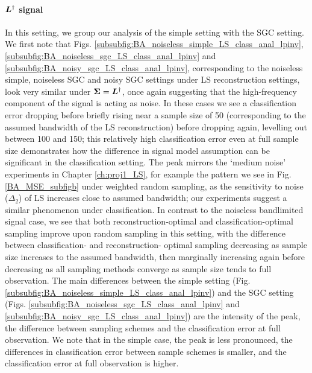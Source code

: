 \paragraph{$\bm{L}^{\dagger}$ signal} In this setting, we group our analysis of the simple setting with the SGC setting. We first note that Figs. \ref{subsubfig:BA_noiseless_simple_LS_class_anal_lpinv}, \ref{subsubfig:BA_noiseless_sgc_LS_class_anal_lpinv} and \ref{subsubfig:BA_noisy_sgc_LS_class_anal_lpinv}, corresponding to the noiseless simple, noiseless SGC and noisy SGC settings under LS reconstruction settings, look very similar under $\bm{\Sigma} = \bm{L}^{\dagger}$, once again suggesting that the high-frequency component of the signal is acting as noise. In these cases we see a classification error dropping before briefly rising near a sample size of 50 (corresponding to the assumed bandwidth of the LS reconstruction) before dropping again, levelling out between 100 and 150; this relatively high classification error even at full sample size demonstrates how the difference in signal model assumption can be significant in the classification setting. The peak mirrors the `medium noise' experiments in Chapter \ref{ch:proj1_LS}, for example the pattern we see in Fig. \ref{BA_MSE_subfigb} under weighted random sampling, as the sensitivity to noise ($\Delta_{2}$) of LS increases close to assumed bandwidth; our experiments suggest a similar phenomenon under classification. In contrast to the noiseless bandlimited signal case, we see that both reconstruction-optimal and classification-optimal sampling improve upon random sampling in this setting, with the difference between classification- and reconstruction- optimal sampling decreasing as sample size increases to the assumed bandwidth, then marginally increasing again before decreasing as all sampling methods converge as sample size tends to full observation. The main differences between the simple setting (Fig. \ref{subsubfig:BA_noiseless_simple_LS_class_anal_lpinv}) and the SGC setting (Figs. \ref{subsubfig:BA_noiseless_sgc_LS_class_anal_lpinv} and \ref{subsubfig:BA_noisy_sgc_LS_class_anal_lpinv}) are the intensity of the peak, the difference between sampling schemes and the classification error at full observation. We note that in the simple case, the peak is less pronounced, the differences in classification error between sample schemes is smaller, and the classification error at full observation is higher.

